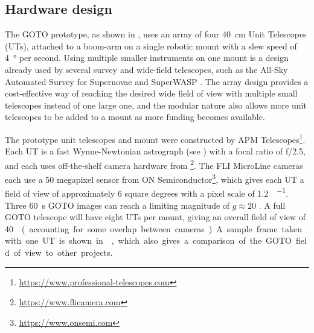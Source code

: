 \subsection{Hardware design}
\label{sec:goto_design}
\begin{colsection}

The GOTO prototype, as shown in , uses an array of four \SI{40}{\cm} Unit Telescopes (UTs), attached to a boom-arm on a single robotic mount with a slew speed of \SI{4}{\degree} per second. Using multiple smaller instruments on one mount is a design already used by several survey and wide-field telescopes, such as the All-Sky Automated Survey for Supernovae  \citep[ASAS-SN,][]{ASAS-SN} and SuperWASP  \citep[Wide Angle Search for Planets,][]{SuperWASP}. The array design provides a cost-effective way of reaching the desired wide field of view with multiple small telescopes instead of one large one, and the modular nature also allows more unit telescopes to be added to a mount as more funding becomes available.

\newpage

The prototype unit telescopes and mount were constructed by APM Telescopes\footnote{\url{https://www.professional-telescopes.com}}. Each UT is a fast Wynne-Newtonian astrograph (see ) with a focal ratio of f/2.5, and each uses off-the-shelf camera hardware from \footnote{\url{https://www.flicamera.com}}. The FLI MicroLine cameras each use a 50 megapixel sensor from ON Semiconductor\footnote{\url{https://www.onsemi.com}}, which gives each UT a field of view of approximately 6 square degrees with a pixel scale of \SI[per-mode=symbol]{1.2}{\arcsec\per\pixel}. Three \SI{60}{\second} GOTO images can reach a limiting magnitude of $g \approx 20$ \citep[see ;][]{S190425z_GOTO}. A full GOTO telescope will have eight UTs per mount, giving an overall field of view of \SI{40}{\square\deg} (accounting for some overlap between cameras). A sample frame taken with one UT is shown in , which also gives a comparison of the GOTO field of view to other projects.


\end{colsection}
